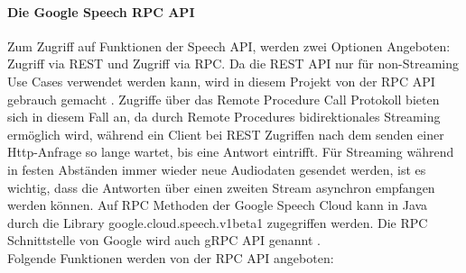 \paragraph{Die Google Speech RPC API}
Zum Zugriff auf Funktionen der Speech API, werden zwei Optionen Angeboten: Zugriff via REST und Zugriff via RPC. Da die REST API nur für non-Streaming Use Cases verwendet werden kann, wird in diesem Projekt von der RPC API gebrauch gemacht \cite{https://cloud.google.com/speech/docs/apis}. Zugriffe über das Remote Procedure Call Protokoll bieten sich in diesem Fall an, da durch Remote Procedures bidirektionales Streaming ermöglich wird, während ein Client bei REST Zugriffen nach dem senden einer Http-Anfrage so lange wartet, bis eine Antwort eintrifft. Für Streaming während in festen Abständen immer wieder neue Audiodaten gesendet werden, ist es wichtig, dass die Antworten über einen zweiten Stream asynchron empfangen werden können. Auf RPC Methoden der Google Speech Cloud kann in Java durch die Library google.cloud.speech.v1beta1 zugegriffen werden. Die RPC Schnittstelle von Google wird auch gRPC API genannt \cite{tps://cloud.google.com/speech/docs/apis}.\\
Folgende Funktionen werden von der RPC API angeboten:\\
